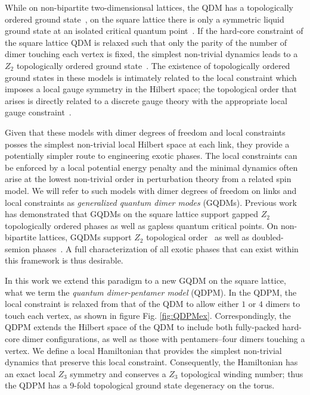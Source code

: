 \documentclass[twocolumn,prb,aps,floatfix,superscriptaddress]{revtex4-1}
\newcommand{\figref}[1]{Fig. \ref{#1}}
\begin{document}
While on non-bipartite two-dimensionsal lattices, the QDM has a topologically ordered ground state~\cite{Moessner2001a,Fendley2002}, on the square lattice there is only a symmetric liquid ground state at an isolated critical quantum point~\cite{Leung1996,Syljuasen2006}. If the hard-core constraint of the square lattice QDM is relaxed such that only the parity of the number of dimer touching each vertex is fixed, the simplest non-trivial dynamics leads to a $Z_2$ topologically ordered ground state~\cite{Kitaev2003,Wen2003}. The existence of topologically ordered ground states in these models is intimately related to the local constraint which imposes a local gauge symmetry in the Hilbert space; the topological order that arises is directly related to a discrete gauge theory with the appropriate local gauge constraint~\cite{Moessner2001}.

Given that these models with dimer degrees of freedom and local constraints posses the simplest non-trivial local Hilbert space at each link, they provide a potentially simpler route to engineering exotic phases. The local constraints can be enforced by a local potential energy penalty and the minimal dynamics often arise at the lowest non-trivial order in perturbation theory from a related spin model. We will refer to such models with dimer degrees of freedom on links and local constraints as \emph{generalized quantum dimer modes} (GQDMs). Previous work has demonstrated that GQDMs on the square lattice support gapped $Z_2$ topologically ordered phases as well as gapless quantum critical points. On non-bipartite lattices, GQDMs support $Z_2$ topological order~\cite{Moessner2001a,Misguich2002} as well as doubled-semion phases~\cite{Qi2014,Buerschaper2014a}. A full characterization of all exotic phases that can exist within this framework is thus desirable.

In this work we extend this paradigm to a new GQDM on the square lattice, what we term the \emph{quantum dimer-pentamer model} (QDPM). In the QDPM, the local constraint is relaxed from that of the QDM to allow either $1$ or $4$ dimers to touch each vertex, as shown in figure \figref{fig:QDPMex}. Correspondingly, the QDPM extends the Hilbert space of the QDM to include both fully-packed hard-core dimer configurations, as well as those with pentamers--four dimers touching a vertex. We define a local Hamiltonian that provides the simplest non-trivial dynamics that preserve this local constraint. Consequently, the Hamiltonian has an exact local $Z_3$ symmetry and conserves a $Z_3$ topological winding number; thus the QDPM has a 9-fold topological ground state degeneracy on the torus.
\end{document}
